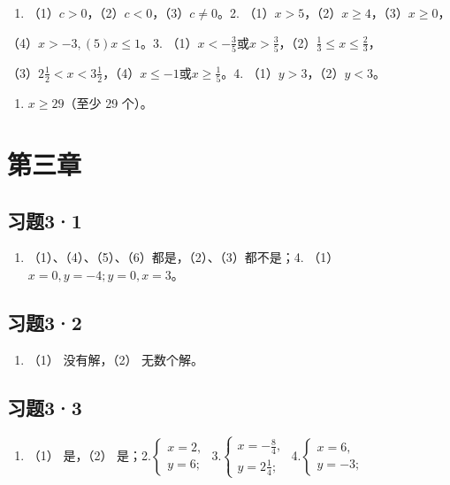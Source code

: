 \begin{enumerate}
\item
  （1）\(c > 0\)，（2）\(c < 0\)，（3）\(c \neq 0\)。2.
  （1）\(x > 5\)，（2）\(x \geqslant 4\)，（3）\(x \geqslant 0\)，
\end{enumerate}

（4）\(x > -3, (5)x \leqslant 1\)。3.
（1）\(x < -\frac{3}{5}\)或\(x > \frac{3}{5}\)，（2）\(\frac{1}{3} \leqslant x \leqslant \frac{2}{3}\)，

（3）\(2\frac{1}{2} < x < 3\frac{1}{2}\)，（4）\(x \leqslant -1\)或\(x \geqslant \frac{1}{5}\)。4.
（1）\(y > 3\)，（2）\(y < 3\)。

\begin{enumerate}[start=5]
\item
  \(x \geqslant 29\)（至少 29 个）。
\end{enumerate}

\section{第三章}

\subsection{习题3·1}

\begin{enumerate}
\item
  （1）、（4）、（5）、（6）都是，（2）、（3）都不是；4.
  （1）\(x = 0, y = -4; y = 0, x = 3\)。
\end{enumerate}

\subsection{习题3·2}

\begin{enumerate}[start=2]
\item
  （1） 没有解，（2） 无数个解。
\end{enumerate}

\subsection{习题3·3}

\begin{enumerate}
\item
  （1） 是，（2）
  是；2.\(\left\{ \begin{array}{l} x = 2, \\ y = 6; \end{array} \right.\)
  3.\(\left\{ \begin{array}{l} x = -\frac{8}{4}, \\ y = 2\frac{1}{4}; \end{array} \right.\)
  4.\(\left\{ \begin{array}{l} x = 6, \\ y = -3; \end{array} \right.\)
\end{enumerate}

